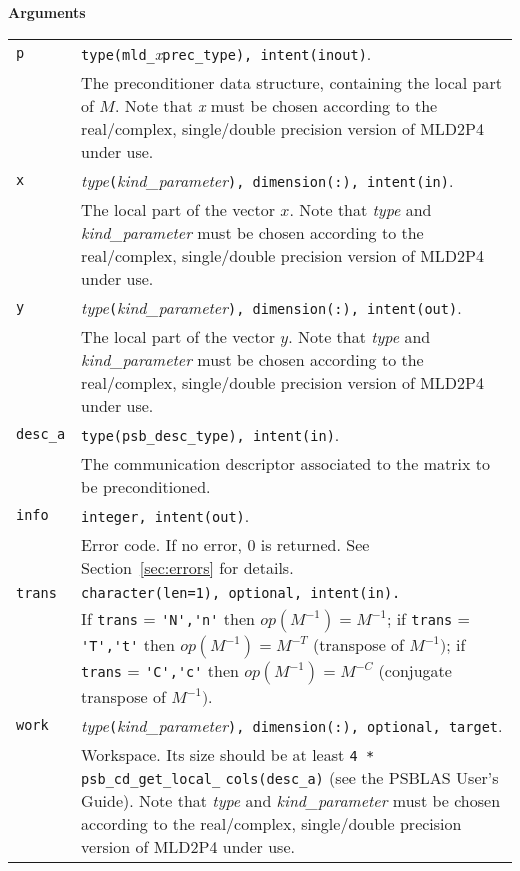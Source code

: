 {\baselineskip\noindent\large\bfseries Arguments}

\begin{tabular}{p{1.2cm}p{12cm}}
\verb|p|      & \verb|type(mld_|\emph{x}\verb|prec_type), intent(inout)|.\\
              & The preconditioner data structure, containing the local part of $M$.
                Note that \emph{x} must be chosen according
                to the real/complex, single/double precision version of MLD2P4 under use.\\
\verb|x|      & \emph{type}\verb|(|\emph{kind\_parameter}\verb|), dimension(:), intent(in)|.\\
              & The local part of the vector $x$. Note that \emph{type} and   
                \emph{kind\_parameter} must be chosen according
                to the real/complex, single/double precision version of MLD2P4 under use.\\
\verb|y|      & \emph{type}\verb|(|\emph{kind\_parameter}\verb|), dimension(:), intent(out)|.\\
              & The local part of the vector $y$. Note that \emph{type} and
                \emph{kind\_parameter} must be chosen according
                to the real/complex, single/double precision version of MLD2P4 under use.\\
\verb|desc_a| & \verb|type(psb_desc_type), intent(in)|. \\
              & The communication descriptor associated to the matrix to be
                preconditioned.\\
\verb|info|   & \verb|integer, intent(out)|.\\
              & Error code. If no error, 0 is returned. See Section~\ref{sec:errors} for details.\\
\verb|trans|  & \verb|character(len=1), optional, intent(in).|\\
              & If \verb|trans| = \verb|'N','n'| then $op(M^{-1}) = M^{-1}$;
                if \verb|trans| = \verb|'T','t'| then $op(M^{-1}) = M^{-T}$
                (transpose of $M^{-1})$;  if \verb|trans| = \verb|'C','c'| then $op(M^{-1}) = M^{-C}$
                (conjugate transpose of $M^{-1})$.\\
\verb|work|  & \emph{type}\verb|(|\emph{kind\_parameter}\verb|), dimension(:), optional, target|.\\
             & Workspace. Its size should be at
               least \verb|4 * psb_cd_get_local_| \verb|cols(desc_a)| (see the PSBLAS User's Guide).
               Note that \emph{type} and \emph{kind\_parameter} must be chosen according
               to the real/complex, single/double precision version of MLD2P4 under use.\\
\end{tabular}

